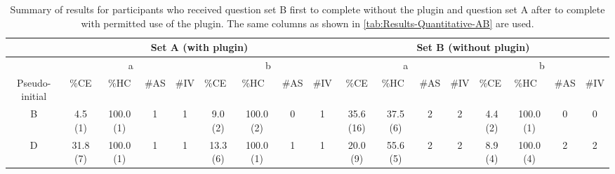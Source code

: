 \begin{landscape}
  \begin{table}
    \footnotesize
    \caption{
      Summary of results for participants who received question set B first to complete without the plugin and question set A after to complete with permitted use of the plugin.
      The same columns as shown in \autoref{tab:Results-Quantitative-AB} are used.
    }
    \centering
    \begin{tabular}{@{}ccccccccccccccccc@{}}
      \toprule
      \multicolumn{1}{l}{}                & \multicolumn{8}{c}{Set A (with plugin)}                                                                                                                              & \multicolumn{8}{c}{Set B (without plugin)}                                                                                                                                                              \\ \midrule
      \multicolumn{1}{c|}{}               & \multicolumn{4}{c|}{a}                                  & \multicolumn{4}{c|}{b}                                                                                     & \multicolumn{4}{c|}{a}                                                                      & \multicolumn{4}{c}{b}                                                                                     \\ \midrule
      \multicolumn{1}{c|}{Pseudo-initial} & \%CE     & \%HC      & \#AS & \multicolumn{1}{l|}{\#IV} & \multicolumn{1}{l}{\%CE} & \multicolumn{1}{l}{\%HC} & \multicolumn{1}{l}{\#AS} & \multicolumn{1}{l|}{\#IV} & \%CE      & \multicolumn{1}{l}{\%HC} & \multicolumn{1}{l}{\#AS} & \multicolumn{1}{l|}{\#IV} & \multicolumn{1}{l}{\%CE} & \multicolumn{1}{l}{\%HC} & \multicolumn{1}{l}{\#AS} & \multicolumn{1}{l}{\#IV} \\ \midrule
      \multicolumn{1}{c|}{B}              & 4.5 (1)  & 100.0 (1) & 1    & \multicolumn{1}{c|}{1}    & 9.0 (2)                  & 100.0 (2)                & 0                        & \multicolumn{1}{c|}{1}    & 35.6 (16) & 37.5 (6)                 & 2                        & \multicolumn{1}{c|}{2}    & 4.4 (2)                  & 100.0 (1)                & 0                        & 0                        \\
      \multicolumn{1}{c|}{D}              & 31.8 (7) & 100.0 (1) & 1    & \multicolumn{1}{c|}{1}    & 13.3 (6)                 & 100.0 (1)                & 1                        & \multicolumn{1}{c|}{1}    & 20.0 (9)  & 55.6 (5)                 & 2                        & \multicolumn{1}{c|}{2}    & 8.9 (4)                  & 100.0 (4)                & 2                        & 2                        \\

\end{tabular}
\end{table}
\end{landscape}
